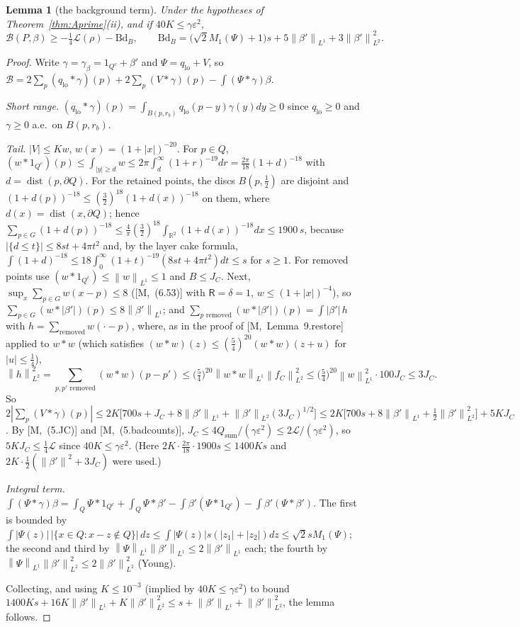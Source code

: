 \documentclass[11pt,reqno]{amsart}
\numberwithin{equation}{section}
\theoremstyle{plain}
\newtheorem{lemma}[theorem]{Lemma}
\theoremstyle{definition}
\newcommand{\R}{\mathbb{R}}
\newcommand{\dist}{\operatorname{dist}}
\newcommand{\lo}{\mathrm{lo}}
\newcommand{\norm}[1]{\left\|#1\right\|}
\newcommand{\cL}{\mathcal{L}}
\newcommand{\cB}{\mathcal{B}}
\newcommand{\fR}{\mathsf{R}}
\newcommand{\Bd}{\mathrm{Bd}}
\newcommand{\ms}[1]{\textup{[M,~#1]}}
\begin{document}
\begin{lemma}[the background term]\label{lem:Bterm}
Under the hypotheses of Theorem~\ref{thm:Aprime}\textup{(ii)}, and if $40K\le\gamma\varepsilon^2$,
\[
\cB(P,\beta)\ge-\tfrac14\cL(\rho)-\Bd_B,\qquad\Bd_B=\big(\sqrt2M_1(\Psi)+1\big)s+5\norm{\beta'}_{L^1}+3\norm{\beta'}^2_{L^2}.
\]
\end{lemma}
\begin{proof}
Write $\gamma=\gamma_\beta=1_{Q^c}+\beta'$ and $\Psi=q_\lo+V$, so $\cB=2\sum_p(q_\lo*\gamma)(p)+2\sum_p(V*\gamma)(p)-\int(\Psi*\gamma)\beta$.

\emph{Short range.}  $(q_\lo*\gamma)(p)=\int_{B(p,r_b)}q_\lo(p-y)\gamma(y)dy\ge0$ since $q_\lo\ge0$ and $\gamma\ge0$ a.e.\ on $B(p,r_b)$.

\emph{Tail.}  $|V|\le Kw$, $w(x)=(1+|x|)^{-20}$.  For $p\in Q$, $(w*1_{Q^c})(p)\le\int_{|y|\ge d}w\le2\pi\int_d^\infty(1+r)^{-19}dr=\frac{2\pi}{18}(1+d)^{-18}$ with $d=\dist(p,\partial Q)$.  For the retained points, the discs $B(p,\frac12)$ are disjoint and $(1+d(p))^{-18}\le(\frac32)^{18}(1+d(x))^{-18}$ on them, where $d(x)=\dist(x,\partial Q)$; hence $\sum_{p\in G}(1+d(p))^{-18}\le\frac4\pi(\frac32)^{18}\int_{\R^2}(1+d(x))^{-18}dx\le1900\,s$, because $|\{d\le t\}|\le8st+4\pi t^2$ and, by the layer cake formula, $\int(1+d)^{-18}\le18\int_0^\infty(1+t)^{-19}(8st+4\pi t^2)dt\le s$ for $s\ge1$.  For removed points use $(w*1_{Q^c})\le\norm w_{L^1}\le1$ and $B\le J_C$.  Next, $\sup_x\sum_{p\in G}w(x-p)\le8$ (\ms{(6.53)} with $\fR=\delta=1$, $w\le(1+|x|)^{-4}$), so $\sum_{p\in G}(w*|\beta'|)(p)\le8\norm{\beta'}_{L^1}$; and $\sum_{p\text{ removed}}(w*|\beta'|)(p)=\int|\beta'|\,h$ with $h=\sum_{\text{removed}}w(\cdot-p)$, where, as in the proof of \ms{Lemma~9.restore} applied to $w*w$ (which satisfies $(w*w)(z)\le(\frac54)^{20}(w*w)(z+u)$ for $|u|\le\frac14$),
\[
\norm h_{L^2}^2=\sum_{p,p'\text{ removed}}(w*w)(p-p')\le\big(\tfrac54\big)^{20}\norm{w*w}_{L^1}\norm{f_C}_{L^2}^2\le\big(\tfrac54\big)^{20}\norm w_{L^1}^2\cdot100J_C\le3J_C .
\]
So $2|\sum_p(V*\gamma)(p)|\le2K\big[700s+J_C+8\norm{\beta'}_{L^1}+\norm{\beta'}_{L^2}(3J_C)^{1/2}\big]\le2K\big[700s+8\norm{\beta'}_{L^1}+\frac12\norm{\beta'}^2_{L^2}\big]+5KJ_C$.  By \ms{(5.JC)} and \ms{(5.badcounts)}, $J_C\le4Q_{\mathrm{sum}}/(\gamma\varepsilon^2)\le2\cL/(\gamma\varepsilon^2)$, so $5KJ_C\le\frac14\cL$ since $40K\le\gamma\varepsilon^2$.  (Here $2K\cdot\frac{2\pi}{18}\cdot1900s\le1400Ks$ and $2K\cdot\frac12(\norm{\beta'}^2+3J_C)$ were used.)

\emph{Integral term.}  $\int(\Psi*\gamma)\beta=\int_Q\Psi*1_{Q^c}+\int_Q\Psi*\beta'-\int\beta'(\Psi*1_{Q^c})-\int\beta'(\Psi*\beta')$.  The first is bounded by $\int|\Psi(z)|\,|\{x\in Q:x-z\notin Q\}|\,dz\le\int|\Psi(z)|s(|z_1|+|z_2|)dz\le\sqrt2sM_1(\Psi)$; the second and third by $\norm\Psi_{L^1}\norm{\beta'}_{L^1}\le2\norm{\beta'}_{L^1}$ each; the fourth by $\norm\Psi_{L^1}\norm{\beta'}^2_{L^2}\le2\norm{\beta'}_{L^2}^2$ (Young).

Collecting, and using $K\le10^{-3}$ (implied by $40K\le\gamma\varepsilon^2$) to bound $1400Ks+16K\norm{\beta'}_{L^1}+K\norm{\beta'}^2_{L^2}\le s+\norm{\beta'}_{L^1}+\norm{\beta'}^2_{L^2}$, the lemma follows.
\end{proof}
\end{document}

